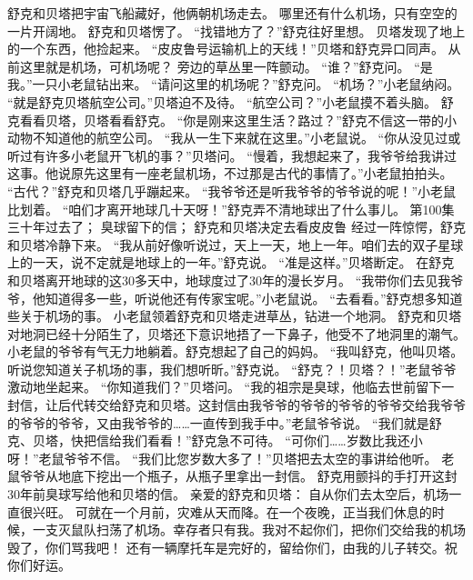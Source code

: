 \documentclass[a4paper,12pt,UTF8,twoside]{ctexbook}
\begin{document}
        舒克和贝塔把宇宙飞船藏好，他俩朝机场走去。 
        哪里还有什么机场，只有空空的一片开阔地。 
        舒克和贝塔愣了。 
        “找错地方了？”舒克往好里想。 
        贝塔发现了地上的一个东西，他捡起来。 
        “皮皮鲁号运输机上的天线！”贝塔和舒克异口同声。 
        从前这里就是机场，可机场呢？ 
        旁边的草丛里一阵颤动。 
        “谁？”舒克问。 
        “是我。”一只小老鼠钻出来。 
        “请问这里的机场呢？”舒克问。 
        “机场？”小老鼠纳闷。 
        “就是舒克贝塔航空公司。”贝塔迫不及待。 
        “航空公司？”小老鼠摸不着头脑。 
        舒克看看贝塔，贝塔看看舒克。 
        “你是刚来这里生活？路过？”舒克不信这一带的小动物不知道他的航空公司。 
        “我从一生下来就在这里。”小老鼠说。 
        “你从没见过或听过有许多小老鼠开飞机的事？”贝塔问。 
        “慢着，我想起来了，我爷爷给我讲过这事。他说原先这里有一座老鼠机场，不过那是古代的事情了。”小老鼠拍拍头。 
        “古代？”舒克和贝塔几乎蹦起来。 
        “我爷爷还是听我爷爷的爷爷说的呢！”小老鼠比划着。 
        “咱们才离开地球几十天呀！”舒克弄不清地球出了什么事儿。   第100集 
        三十年过去了； 
        臭球留下的信； 
        舒克和贝塔决定去看皮皮鲁   
        经过一阵惊愕，舒克和贝塔冷静下来。 
        “我从前好像听说过，天上一天，地上一年。咱们去的双子星球上的一天，说不定就是地球上的一年。”舒克说。 
        “准是这样。”贝塔断定。 
        在舒克和贝塔离开地球的这30多天中，地球度过了30年的漫长岁月。 
        “我带你们去见我爷爷，他知道得多一些，听说他还有传家宝呢。”小老鼠说。 
        “去看看。”舒克想多知道些关于机场的事。 
        小老鼠领着舒克和贝塔走进草丛，钻进一个地洞。 
        舒克和贝塔对地洞已经十分陌生了，贝塔还下意识地捂了一下鼻子，他受不了地洞里的潮气。 
        小老鼠的爷爷有气无力地躺着。舒克想起了自己的妈妈。 
        “我叫舒克，他叫贝塔。听说您知道关子机场的事，我们想听昕。”舒克说。 
        “舒克？！贝塔？！”老鼠爷爷激动地坐起来。 
        “你知道我们？”贝塔问。 
        “我的祖宗是臭球，他临去世前留下一封信，让后代转交给舒克和贝塔。这封信由我爷爷的爷爷的爷爷的爷爷交给我爷爷的爷爷的爷爷，又由我爷爷的……一直传到我手中。”老鼠爷爷说。 
        “我们就是舒克、贝塔，快把信给我们看看！”舒克急不可待。 
        “可你们……岁数比我还小呀！”老鼠爷爷不信。 
        “我们比您岁数大多了！”贝塔把去太空的事讲给他听。 
        老鼠爷爷从地底下挖出一个瓶子，从瓶子里拿出一封信。 
        舒克用颤抖的手打开这封30年前臭球写给他和贝塔的信。 
        亲爱的舒克和贝塔： 
        自从你们去太空后，机场一直很兴旺。 
        可就在一个月前，灾难从天而降。在一个夜晚，正当我们休息的时候，一支灭鼠队扫荡了机场。幸存者只有我。我对不起你们，把你们交给我的机场毁了，你们骂我吧！ 
        还有一辆摩托车是完好的，留给你们，由我的儿子转交。祝你们好运。 
\end{document}
